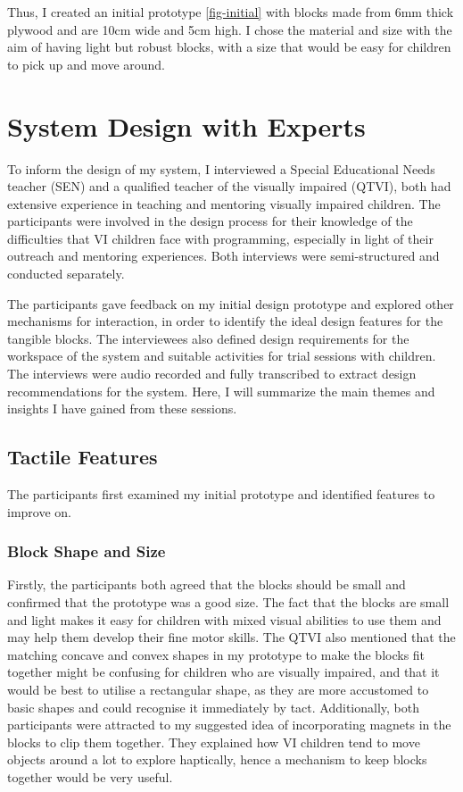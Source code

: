\documentclass[oneside,%
                    author={Malak Hajji},
                    degree={BSc},
                    title={Designing An Accessible Computational Toolkit For Students},
                  subtitle={With Mixed Visual Abilities}]{dissertation}
\begin{document}
Thus, I created an initial prototype \ref{fig-initial} with blocks made from 6mm thick plywood and are 10cm wide and 5cm high. I chose the material and size with the aim of having light but robust blocks, with a size that would be easy for children to pick up and move around.


\section{System Design with Experts}
To inform the design of my system, I interviewed a Special Educational Needs teacher (SEN) and a qualified teacher of the visually impaired (QTVI), both had extensive experience in teaching and mentoring visually impaired children. The participants were involved in the design process for their knowledge of the difficulties that VI children face with programming, especially in light of their outreach and mentoring experiences. Both interviews were semi-structured and conducted separately.

The participants gave feedback on my initial design prototype and explored other mechanisms for interaction, in order to identify the ideal design features for the tangible blocks. The interviewees also defined design requirements for the workspace of the system and suitable activities for trial sessions with children. 
The interviews were audio recorded and fully transcribed to extract design recommendations for the system. Here, I will summarize the main themes and insights I have gained from these sessions.

\subsection{Tactile Features}
The participants first examined my initial prototype and identified features to improve on.
\subsubsection{Block Shape and Size}
Firstly, the participants both agreed that the blocks should be small and confirmed that the prototype was a good size. The fact that the blocks are small and light makes it easy for  children with mixed visual abilities to use them and may help them develop their fine motor skills. The QTVI also mentioned that the  matching concave and convex shapes in my prototype to make the blocks fit together might be confusing for children who are visually impaired, and that it would be best to utilise a rectangular shape, as they are more accustomed to basic shapes and could recognise it immediately by tact. Additionally, both participants were attracted to my suggested idea of incorporating magnets in the blocks to clip them together. They explained how VI children tend to move objects around a lot to explore haptically, hence a mechanism to keep blocks together would be very useful.
\end{document}

